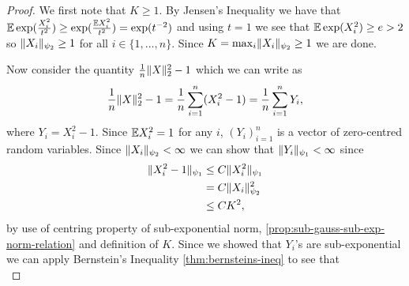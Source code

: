 \documentclass{article}
\begin{document}
\begin{proof}
  We first note that \(K \geq 1\). By Jensen's Inequality we have that
  \(\mathbb{E} \exp(\frac{X_{i}^{2}}{t^{2}}) \geq \exp(\frac{\mathbb{E} X_{i}^{2}}{t^{2}}) = \exp(t^{-2})\)
  and using \(t = 1\) we see that \(\mathbb{E} \exp(X_{i}^{2}) \geq e > 2\) so
  \(\lVert X_{i}\rVert_{\psi_{2}} \geq 1\) for all \(i \in \{1, \dots, n\}\). Since
  \(K = \max_{i}\lVert X_{i}\rVert_{\psi_{2}} \geq 1\) we are done.

  Now consider the quantity \(\frac{1}{n}\lVert X\rVert_{2}^{2} - 1\) which we can write as
  \begin{equation}
    \frac{1}{n}\lVert X\rVert_{2}^{2} - 1 = \frac{1}{n}\sum_{i=1}^{n}(X_{i}^{2} - 1) = \frac{1}{n}\sum_{i=1}^{n}Y_{i},
  \end{equation}
  where \(Y_{i} = X_{i}^{2} - 1\). Since \(\mathbb{E} X_{i}^{2} = 1\) for any \(i\),
  \((Y_{i})_{i=1}^{n}\) is a vector of zero-centred random variables. Since
  \(\lVert X_{i}\rVert_{\psi_{2}} < \infty\) we can show that
  \(\lVert Y_{i}\rVert_{\psi_{1}} < \infty\) since
  \begin{align}
    \lVert X_i^2 - 1\rVert_{\psi_1} & \leq C\lVert X_i^2\rVert_{\psi_1} \\ 
                              & = C\lVert X_i\rVert_{\psi_2}^2 \\
                              & \leq C K^2,
  \end{align}
  by use of centring property of sub-exponential norm, \cref{prop:sub-gauss-sub-exp-norm-relation} and definition of \(K\). Since we showed
  that \(Y_{i}\)'s are sub-exponential we can apply Bernstein's Inequality
  \cref{thm:bernsteins-ineq} to see that
  \begin{equation}

  \end{equation}
\end{proof}
\end{document}
